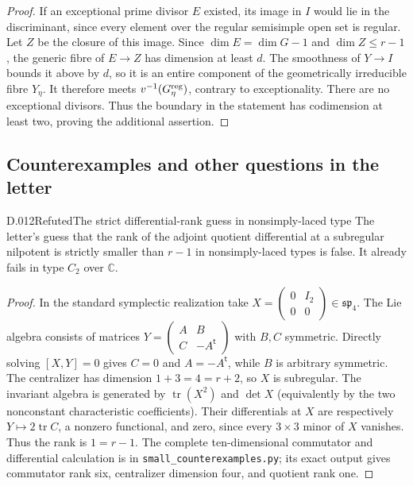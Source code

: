 \begin{proof}
If an exceptional prime divisor $E$ existed, its image
in $I$ would lie in the discriminant, since every element
over the regular semisimple open set is regular.  Let
$Z$ be the closure of this image.  Since
$\dim E=\dim G-1$ and $\dim Z\le r-1$, the generic
fibre of $E\to Z$ has dimension at least $d$.  The
smoothness of $Y\to I$ bounds it above by $d$, so it
is an entire component of the geometrically irreducible
fibre $Y_\eta$.  It therefore meets
$v^{-1}(G_\eta^{\rm reg})$, contrary to exceptionality.
There are no exceptional divisors.  Thus the boundary
in the statement has codimension at least two, proving
the additional assertion.
\end{proof}

\subsection{Counterexamples and other questions in the letter}
\begin{saresult}{D.012}{Refuted}{The strict differential-rank guess in nonsimply-laced type}
The letter's guess that the rank of the adjoint quotient differential
at a subregular nilpotent is strictly smaller than $r-1$ in
nonsimply-laced types is false.  It already fails in type $C_2$ over
$\mathbb C$.
\end{saresult}
\begin{proof}
In the standard symplectic realization take
$X=\left(\begin{smallmatrix}0&I_2\\0&0\end{smallmatrix}\right)
\in\mathfrak{sp}_4$.  The Lie algebra consists of matrices
$Y=\left(\begin{smallmatrix}A&B\\C&-A^{\mathsf t}\end{smallmatrix}\right)$
with $B,C$ symmetric.  Directly solving $[X,Y]=0$ gives $C=0$ and
$A=-A^{\mathsf t}$, while $B$ is arbitrary symmetric.  The
centralizer has dimension $1+3=4=r+2$, so $X$ is subregular.
The invariant algebra is generated by $\operatorname{tr}(X^2)$
and $\det X$ (equivalently by the two nonconstant characteristic
coefficients).  Their differentials at $X$ are respectively
$Y\mapsto2\operatorname{tr}C$, a nonzero functional, and zero,
since every $3\times3$ minor of $X$ vanishes.  Thus the rank is
$1=r-1$.  The complete ten-dimensional commutator and differential
calculation is in \texttt{small\_counterexamples.py}; its exact
output gives commutator rank six, centralizer dimension four, and
quotient rank one.
\end{proof}

